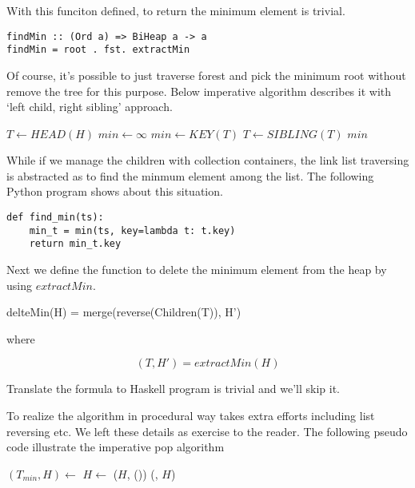 \documentclass{article}
\begin{document}
With this funciton defined, to return the minimum element is trivial.

\begin{lstlisting}
findMin :: (Ord a) => BiHeap a -> a
findMin = root . fst. extractMin
\end{lstlisting}

Of course, it's possible to just traverse forest and pick the
minimum root without remove the tree for this purpose. Below
imperative algorithm describes it with `left child, right sibling' 
approach.

\begin{algorithmic}[1]
  \State $T \gets HEAD(H)$
  \State $min \gets \infty$
      \State $min \gets KEY(T)$
    \EndIf
    \State $T \gets SIBLING(T)$
  \EndWhile
  \State \Return $min$
\EndFunction
\end{algorithmic}

While if we manage the children with collection containers, the link
list traversing is abstracted as to find the minmum element among the list.
The following Python program shows about this situation.

\lstset{language=Python}
\begin{lstlisting}
def find_min(ts):
    min_t = min(ts, key=lambda t: t.key)
    return min_t.key
\end{lstlisting}

Next we define the function to delete the minimum element from
the heap by using $extractMin$.

\be
delteMin(H) = merge(reverse(Children(T)), H')
\ee

where

\[
  (T, H') = extractMin(H)
\]

Translate the formula to Haskell program is trivial and we'll skip
it.

To realize the algorithm in procedural way takes extra efforts
including list reversing etc. We left these details as exercise to the
reader. The following pseudo code illustrate the imperative 
pop algorithm

\begin{algorithmic}[1]
  \State $(T_{min}, H) \gets$ 
  \State $H \gets$ ($H$, ())
  \State \Return (, $H$)
\EndFunction
\end{algorithmic}
\end{document}
